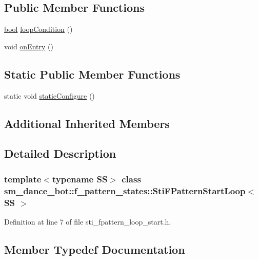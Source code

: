 \subsection*{Public Member Functions}
\begin{DoxyCompactItemize}
\item 
\hyperlink{classbool}{bool} \hyperlink{structsm__dance__bot_1_1f__pattern__states_1_1StiFPatternStartLoop_a96b8f0ea52222677cf4888165bb7df1b}{loop\+Condition} ()
\item 
void \hyperlink{structsm__dance__bot_1_1f__pattern__states_1_1StiFPatternStartLoop_a25e4397fd40697961b79b56dd15ed038}{on\+Entry} ()
\end{DoxyCompactItemize}
\subsection*{Static Public Member Functions}
\begin{DoxyCompactItemize}
\item 
static void \hyperlink{structsm__dance__bot_1_1f__pattern__states_1_1StiFPatternStartLoop_a0afdecaf306a1ada485ae632cc77a753}{static\+Configure} ()
\end{DoxyCompactItemize}
\subsection*{Additional Inherited Members}


\subsection{Detailed Description}
\subsubsection*{template$<$typename SS$>$\newline
class sm\+\_\+dance\+\_\+bot\+::f\+\_\+pattern\+\_\+states\+::\+Sti\+F\+Pattern\+Start\+Loop$<$ S\+S $>$}



Definition at line 7 of file sti\+\_\+fpattern\+\_\+loop\+\_\+start.\+h.



\subsection{Member Typedef Documentation}
\mbox{\label{structsm__dance__bot_1_1f__pattern__states_1_1StiFPatternStartLoop_ab410fb656e621c3ce2ee7bb0bb11eae2}} 
